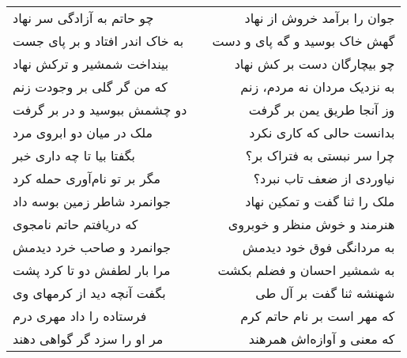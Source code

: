 \begin{center}
\begin{longtable}{l p{0.5cm} r}
\\
چو حاتم به آزادگی سر نهاد
&&
جوان را برآمد خروش از نهاد
\\
به خاک اندر افتاد و بر پای جست
&&
گهش خاک بوسید و گه پای و دست
\\
بینداخت شمشیر و ترکش نهاد
&&
چو بیچارگان دست بر کش نهاد
\\
که من گر گلی بر وجودت زنم
&&
به نزدیک مردان نه مردم، زنم
\\
دو چشمش ببوسید و در بر گرفت
&&
وز آنجا طریق یمن بر گرفت
\\
ملک در میان دو ابروی مرد
&&
بدانست حالی که کاری نکرد
\\
بگفتا بیا تا چه داری خبر
&&
چرا سر نبستی به فتراک بر؟
\\
مگر بر تو نام‌آوری حمله کرد
&&
نیاوردی از ضعف تاب نبرد؟
\\
جوانمرد شاطر زمین بوسه داد
&&
ملک را ثنا گفت و تمکین نهاد
\\
که دریافتم حاتم نامجوی
&&
هنرمند و خوش منظر و خوبروی
\\
جوانمرد و صاحب خرد دیدمش
&&
به مردانگی فوق خود دیدمش
\\
مرا بار لطفش دو تا کرد پشت
&&
به شمشیر احسان و فضلم بکشت
\\
بگفت آنچه دید از کرمهای وی
&&
شهنشه ثنا گفت بر آل طی
\\
فرستاده را داد مهری درم
&&
که مهر است بر نام حاتم کرم
\\
مر او را سزد گر گواهی دهند
&&
که معنی و آوازه‌اش همرهند
\\
\end{longtable}
\end{center}
